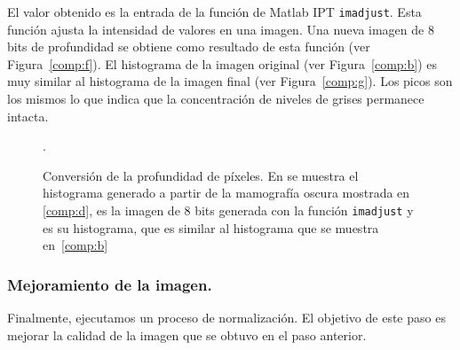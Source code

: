 El valor obtenido es la entrada de la función de Matlab IPT \texttt{imadjust}.
Esta función ajusta la intensidad de valores en una imagen. Una nueva imagen de
8 bits de profundidad se obtiene como resultado de esta función (ver
Figura~\ref{comp:f}). El histograma de la imagen original (ver
Figura~\ref{comp:b}) es muy similar al histograma de la imagen final (ver
Figura~\ref{comp:g}). Los picos son los mismos lo que indica que la
concentración de niveles de grises permanece intacta.

\begin{figure}[h]
  \begin{center}
    \hspace{12pt}
    \hspace{12pt}
  \end{center}

  \caption[Conversión de la profundidad de píxeles]
  {Conversión de la profundidad de píxeles. En \protect{} se
  muestra el histograma generado a partir de la mamografía oscura mostrada en
  \protect\ref{comp:d}, \protect{} es la imagen de 8 bits
  generada con la función \texttt{imadjust} y \protect{} es su
  histograma, que es similar al histograma que se muestra en~\ref{comp:b}}.

  \label{img:shrinking-two}
\end{figure}

\subsubsection{Mejoramiento de la imagen.}

Finalmente, ejecutamos un proceso de normalización. El objetivo de este paso es
mejorar la calidad de la imagen que se obtuvo en el paso anterior.

%
